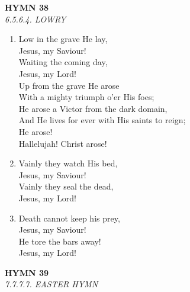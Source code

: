 \documentclass[11pt,a4paper]{article}
\begin{document}
\newpage
\begin{center}
    {\Large \textbf{HYMN 38}}
    \\
    \textit{6.5.6.4. LOWRY}
\end{center}
\vspace{1em}

\begin{enumerate}
    \item Low in the grave He lay, \\
        Jesus, my Saviour! \\
        Waiting the coming day, \\
        Jesus, my Lord! \\
        Up from the grave He arose \\
        With a mighty triumph o'er His foes; \\
        He arose a Victor from the dark domain, \\
        And He lives for ever with His saints to reign; \\
        He arose! \\
        Hallelujah! Christ arose!

    \item Vainly they watch His bed, \\
        Jesus, my Saviour! \\
        Vainly they seal the dead, \\
        Jesus, my Lord!

    \item Death cannot keep his prey, \\
        Jesus, my Saviour! \\
        He tore the bars away! \\
        Jesus, my Lord!

\end{enumerate}

\newpage
\begin{center}
    {\Large \textbf{HYMN 39}}
    \\
    \textit{7.7.7.7. EASTER HYMN}
\end{center}
\vspace{1em}
\end{document}

